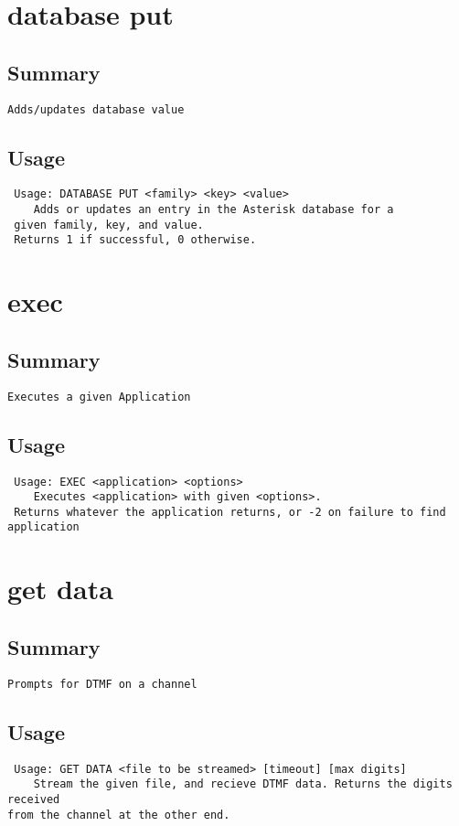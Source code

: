 \section{database put}
\subsection{Summary}
\begin{verbatim}
Adds/updates database value
\end{verbatim}
\subsection{Usage}
\begin{verbatim}
 Usage: DATABASE PUT <family> <key> <value>
	Adds or updates an entry in the Asterisk database for a
 given family, key, and value.
 Returns 1 if successful, 0 otherwise.

\end{verbatim}


\section{exec}
\subsection{Summary}
\begin{verbatim}
Executes a given Application
\end{verbatim}
\subsection{Usage}
\begin{verbatim}
 Usage: EXEC <application> <options>
	Executes <application> with given <options>.
 Returns whatever the application returns, or -2 on failure to find application

\end{verbatim}


\section{get data}
\subsection{Summary}
\begin{verbatim}
Prompts for DTMF on a channel
\end{verbatim}
\subsection{Usage}
\begin{verbatim}
 Usage: GET DATA <file to be streamed> [timeout] [max digits]
	Stream the given file, and recieve DTMF data. Returns the digits received
from the channel at the other end.

\end{verbatim}


